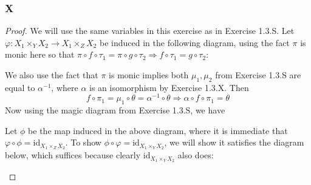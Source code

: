 \documentclass{article}
\newcommand{\id}{\mathrm{id}}
\begin{document}
\subsubsection{X}\label{1.3.X}
\begin{proof}
    We will use the same variables in this exercise as in Exercise 1.3.S. Let $\varphi:X_1\times_YX_2\to X_1\times_ZX_2$ be induced in the following diagram, using the fact $\pi$ is monic here so that $\pi\circ f \circ \tau_1=\pi\circ g \circ \tau_2\Rightarrow f\circ \tau_1=g\circ \tau_2$:
    \begin{center}
    \end{center}
    We also use the fact that $\pi$ is monic implies both $\mu_1,\mu_2$ from Exercise 1.3.S are equal to $\alpha^{-1}$, where $\alpha$ is an isomorphism by Exercise 1.3.X. Then
    \[
    f\circ \pi_1=\mu_1\circ \theta=\alpha^{-1}\circ \theta\Rightarrow \alpha\circ f\circ \pi_1=\theta
    \]
    Now using the magic diagram from Exercise 1.3.S, we have
    \begin{center}
    \end{center}
    Let $\phi$ be the map induced in the above diagram, where it is immediate that $\varphi\circ \phi=\id_{X_1\times_Z X_2}$. To show $\phi\circ \varphi=\id_{X_1\times_Y X_2}$, we will show it satisfies the diagram below, which suffices because clearly $\id_{X_1\times_Y X_2}$ also does:
    \begin{center}
        \begin{tikzcd}

\end{tikzcd}
\end{center}
\end{proof}
\end{document}
